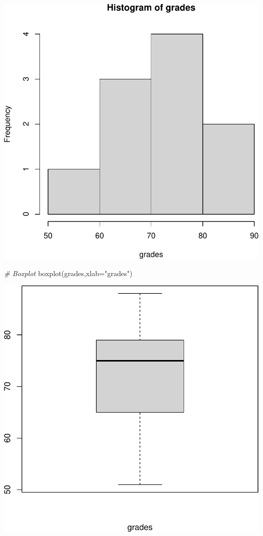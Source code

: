 \documentclass[
]{article}
\newcommand{\AttributeTok}[1]{\textcolor[rgb]{0.77,0.63,0.00}{#1}}
\newcommand{\CommentTok}[1]{\textcolor[rgb]{0.56,0.35,0.01}{\textit{#1}}}
\newcommand{\FunctionTok}[1]{\textcolor[rgb]{0.00,0.00,0.00}{#1}}
\newcommand{\NormalTok}[1]{#1}
\newcommand{\StringTok}[1]{\textcolor[rgb]{0.31,0.60,0.02}{#1}}
\begin{document}
\begin{center}\includegraphics[width=1\linewidth,height=1\textheight]{unnamed-chunk-24-1} \end{center}

\begin{Highlighting}[]
\CommentTok{\# Boxplot}
\FunctionTok{boxplot}\NormalTok{(grades,}\AttributeTok{xlab=}\StringTok{"grades"}\NormalTok{)}
\end{Highlighting}

\begin{center}\includegraphics[width=1\linewidth,height=1\textheight]{unnamed-chunk-24-2} \end{center}
\end{document}

